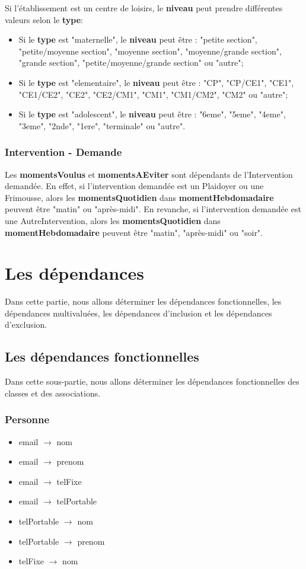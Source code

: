 Si l'établissement est un centre de loisirs, le \textbf{niveau} peut prendre différentes valeurs selon le \textbf{type}:
\begin{itemize}
\item Si le \textbf{type} est "maternelle", le \textbf{niveau} peut être : "petite section", "petite/moyenne section", "moyenne section", "moyenne/grande section", "grande section", "petite/moyenne/grande section" ou "autre";
\item Si le \textbf{type} est "elementaire", le \textbf{niveau} peut être : "CP", "CP/CE1", "CE1", "CE1/CE2", "CE2", "CE2/CM1", "CM1", "CM1/CM2", "CM2" ou "autre";
\item Si le \textbf{type} est "adolescent", le \textbf{niveau} peut être : "6eme", "5eme", "4eme", "3eme", "2nde", "1ere", "terminale" ou "autre". 
\end{itemize}

\subsubsection*{Intervention - Demande}
Les \textbf{momentsVoulus} et \textbf{momentsAEviter} sont dépendants de l'Intervention demandée. En effet, si l'intervention demandée est un Plaidoyer ou une Frimousse, alors les \textbf{momentsQuotidien} dans \textbf{momentHebdomadaire} peuvent être "matin" ou "après-midi". En revanche, si l'intervention demandée est une AutreIntervention, alors les \textbf{momentsQuotidien} dans \textbf{momentHebdomadaire} peuvent être "matin", "après-midi" ou "soir". 
  

\section{Les dépendances}

Dans cette partie, nous allons déterminer les dépendances fonctionnelles, les dépendances multivaluées,  les dépendances d'inclusion et les dépendances d'exclusion. \\

\subsection{Les dépendances fonctionnelles}

Dans cette sous-partie, nous allons déterminer les dépendances fonctionnelles des classes et des associations.  

\subsubsection*{Personne}
\begin{itemize}
\item[] email $\rightarrow$ nom 
\item[] email $\rightarrow$ prenom 
\item[] email $\rightarrow$ telFixe 
\item[] email $\rightarrow$ telPortable 
\item[] telPortable $\rightarrow$ nom
\item[] telPortable $\rightarrow$ prenom
\item[] telFixe $\rightarrow$ nom
\end{itemize}


